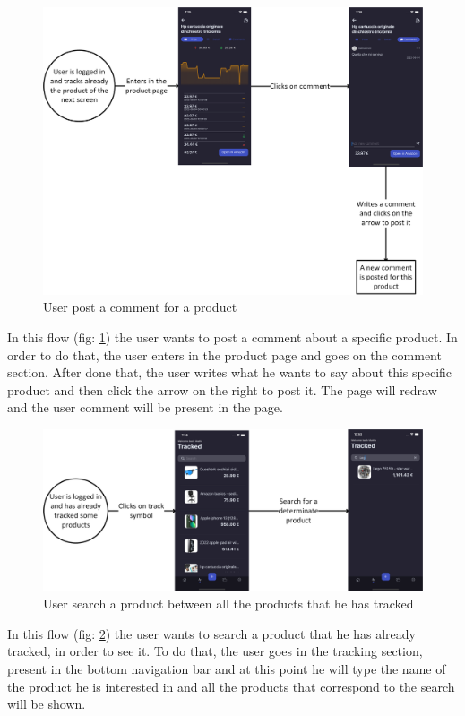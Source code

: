 \begin{figure}[h!]
        \centering
        \includegraphics[scale=0.14]{images/interfaces/user_post_comment.png}
        \caption{User post a comment for a product}
        \label{fig:user_post_comment}
\end{figure}
\FloatBarrier
In this flow (fig: \ref{fig:user_post_comment}) the user wants to post a comment about a specific product. In order to do that, the user enters in the product page and goes on the comment section. After done that, the user writes what he wants to say about this specific product and then click the arrow on the right to post it. The page will redraw and the user comment will be present in the page.

\begin{figure}[h!]
        \centering
        \includegraphics[scale=0.14]{images/interfaces/user_search_in_tracked.png}
        \caption{User search a product between all the products that he has tracked}
        \label{fig:user_search_in_tracked}
\end{figure}
\FloatBarrier
In this flow (fig: \ref{fig:user_search_in_tracked}) the user wants to search a product that he has already tracked, in order to see it. To do that, the user goes in the tracking section, present in the bottom navigation bar and at this point he will type the name of the product he is interested in and all the products that correspond to the search will be shown.

